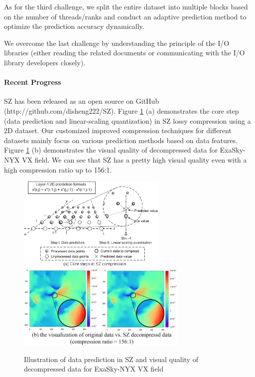 As for the third challenge, we split the entire dataset into multiple blocks based on the number of threads/ranks and conduct an adaptive prediction method to optimize the prediction accuracy dynamically.

We overcome the last challenge by understanding the principle of the I/O libraries (either reading the related documents or communicating with the I/O library developers closely).

\paragraph{Recent Progress}

SZ has been released as an open source on GitHub (http://github.com/disheng222/SZ). Figure \ref{fig:sz-principle} (a) demonstrates the core step (data prediction and linear-scaling quantization) in SZ lossy compression using a 2D dataset. Our customized improved compression techniques for different datasets mainly focus on various prediction methods based on data features. 
Figure \ref{fig:sz-principle} (b) demonstrates the visual quality of decompressed data for ExaSky-NYX VX field. We can see that SZ has a pretty high visual quality even with a high compression ratio up to 156:1. 

\begin{figure}[htb]
\centering
\includegraphics[width=2.8in]{projects/2.3.4-DataViz/2.3.4.06-EZ/sz-illu.png}
\includegraphics[width=3.2in]{projects/2.3.4-DataViz/2.3.4.06-EZ/Visual-quality-NYX-SZ.png}
	\caption{\label{fig:sz-principle}Illustration of data prediction in SZ and visual quality of decompressed data for ExaSky-NYX VX field}
\end{figure}

